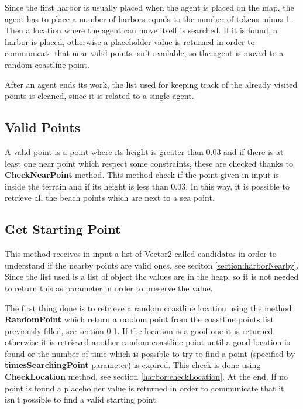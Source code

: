 \documentclass[12pt]{article}
\begin{document}
    Since the first harbor is usually placed when the agent is placed on the map, the agent has to place a number of harbors equals to the number of tokens minus 1. Then a 
    location where the agent can move itself is searched. If it is found, a harbor is placed, otherwise a placeholder value is returned in order to communicate that near valid points
    isn't available, so the agent is moved to a random coastline point.

    After an agent ends its work, the list used for keeping track of the already visited points is cleaned, since it is related to a single agent.

    \subsection{Valid Points} \label{section:HarborValidPoints}
    A valid point is a point where its height is greater than 0.03 and if there is at least one near point which respect some constraints, these are checked thanks to
    \textbf{CheckNearPoint} method. This method check if the point given in input is inside the terrain and if its height is less than 0.03. In this way, it is possible to
    retrieve all the beach points which are next to a sea point.

    \subsection{Get Starting Point} \label{section:harborStartingPoint}
    This method receives in input a list of Vector2 called candidates in order to understand if the nearby points are valid ones, see seciton \ref{section:harborNearby}. Since the list 
    used is a list of object the values are in the heap, so it is not needed to return this as parameter in order to preserve the value.

    The first thing done is to retrieve a random coastline location using the method \textbf{RandomPoint} which return a random point from the coastline points list previously
    filled, see section \ref{section:HarborValidPoints}. If the location is a good one it is returned, otherwise it is retrieved another random coastline point until a good
    location is found or the number of time which is possible to try to find a point (specified by \textbf{timesSearchingPoint} parameter) is expired.
    This check is done using \textbf{CheckLocation} method, see section \ref{harbor:checkLocation}. At the end, If no point is found a placeholder value is returned in order 
    to communicate that it isn't possible to find a valid starting point.
\end{document}
